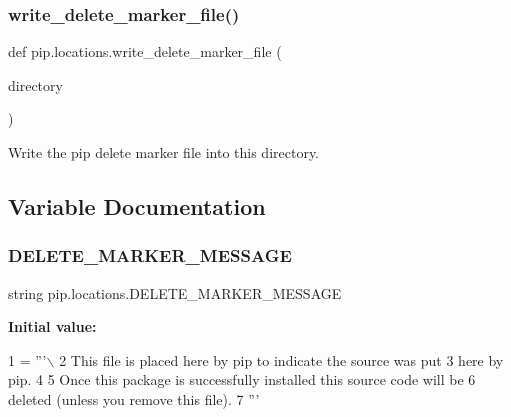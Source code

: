 \subsubsection{\texorpdfstring{write\+\_\+delete\+\_\+marker\+\_\+file()}{write\_delete\_marker\_file()}}
{\footnotesize\ttfamily def pip.\+locations.\+write\+\_\+delete\+\_\+marker\+\_\+file (\begin{DoxyParamCaption}\item[{}]{directory }\end{DoxyParamCaption})}

\begin{DoxyVerb}Write the pip delete marker file into this directory.
\end{DoxyVerb}
 

\subsection{Variable Documentation}
\mbox{\label{namespacepip_1_1locations_a1f09408b763218672d11f193e7aa6a68}} 
\subsubsection{\texorpdfstring{D\+E\+L\+E\+T\+E\+\_\+\+M\+A\+R\+K\+E\+R\+\_\+\+M\+E\+S\+S\+A\+GE}{DELETE\_MARKER\_MESSAGE}}
{\footnotesize\ttfamily string pip.\+locations.\+D\+E\+L\+E\+T\+E\+\_\+\+M\+A\+R\+K\+E\+R\+\_\+\+M\+E\+S\+S\+A\+GE}

{\bfseries Initial value\+:}
\begin{DoxyCode}
1 =  \textcolor{stringliteral}{'''\(\backslash\)}
2 \textcolor{stringliteral}{This file is placed here by pip to indicate the source was put}
3 \textcolor{stringliteral}{here by pip.}
4 \textcolor{stringliteral}{}
5 \textcolor{stringliteral}{Once this package is successfully installed this source code will be}
6 \textcolor{stringliteral}{deleted (unless you remove this file).}
7 \textcolor{stringliteral}{'''}
\end{DoxyCode}
\mbox{\label{namespacepip_1_1locations_a8e5f514d46a86886953af92000262223}} 
